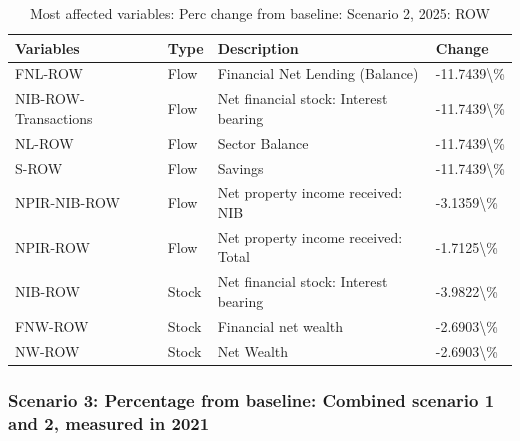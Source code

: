 \documentclass[
]{book}
\begin{document}
\begin{table}

\caption{\label{tab:most-affected-scenario-2-perc-2025-ROW}Most affected variables: Perc change from baseline: Scenario 2, 2025: ROW}
\centering
\fontsize{10}{12}\selectfont
\begin{tabular}[t]{l|l|l|l}
\hline
Variables & Type & Description & Change\\
\hline
FNL-ROW & Flow & Financial Net Lending (Balance) & -11.7439\textbackslash{}\%\\
\hline
NIB-ROW-Transactions & Flow & Net financial stock: Interest bearing & -11.7439\textbackslash{}\%\\
\hline
NL-ROW & Flow & Sector Balance & -11.7439\textbackslash{}\%\\
\hline
S-ROW & Flow & Savings & -11.7439\textbackslash{}\%\\
\hline
NPIR-NIB-ROW & Flow & Net property income received: NIB & -3.1359\textbackslash{}\%\\
\hline
NPIR-ROW & Flow & Net property income received: Total & -1.7125\textbackslash{}\%\\
\hline
NIB-ROW & Stock & Net financial stock: Interest bearing & -3.9822\textbackslash{}\%\\
\hline
FNW-ROW & Stock & Financial net wealth & -2.6903\textbackslash{}\%\\
\hline
NW-ROW & Stock & Net Wealth & -2.6903\textbackslash{}\%\\
\hline
\end{tabular}
\end{table}

\hypertarget{scenario-3-percentage-from-baseline-combined-scenario-1-and-2-measured-in-2021}{%
\subsubsection{Scenario 3: Percentage from baseline: Combined scenario 1 and 2, measured in 2021}\label{scenario-3-percentage-from-baseline-combined-scenario-1-and-2-measured-in-2021}}
\end{document}

